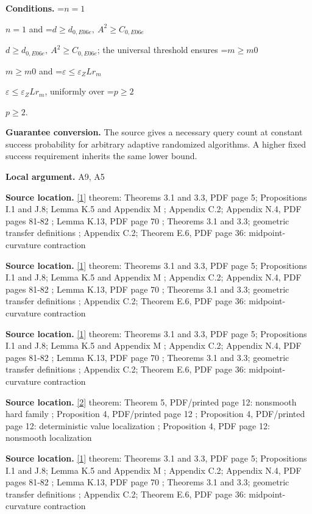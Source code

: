 \documentclass[10pt,a4paper]{article}
\newcommand{\AtlasMath}[1]{\par\begingroup\centering\setbox0=\hbox{$\displaystyle #1$}\ifdim\wd0>1.4\linewidth\typeout{ATLAS WIDE FORMULA: \the\wd0}\fi\ifdim\wd0>\linewidth\resizebox{\linewidth}{!}{\box0}\else\box0\fi\par\endgroup}
\newcommand{\AtlasInlineMath}[1]{\begingroup\setbox0=\hbox{$#1$}\ifdim\wd0>.4\linewidth\endgroup\AtlasMath{#1}\else\endgroup$#1$\fi}
\begin{document}
\textbf{Conditions.} \AtlasInlineMath{n=1} and \AtlasInlineMath{d\ge d_{0,E06e},\ A^2\ge C_{0,E06e}}; the universal threshold ensures \AtlasInlineMath{m\ge m0} and \AtlasInlineMath{\varepsilon \le \varepsilon _Z Lr_m}, uniformly over \AtlasInlineMath{p\ge 2}.

\textbf{Guarantee conversion.} The source gives a necessary query count at constant success probability for arbitrary adaptive randomized algorithms. A higher fixed success requirement inherits the same lower bound.

\textbf{Local argument.} A9, A5

\textbf{Source location.} \href{https://arxiv.org/html/2610.00345v1}{[1]} theorem: Theorems 3.1 and 3.3, PDF page 5; Propositions I.1 and J.8; Lemma K.5 and Appendix M ; Appendix C.2; Appendix N.4, PDF pages 81-82 ; Lemma K.13, PDF page 70 ; Theorems 3.1 and 3.3; geometric transfer definitions ; Appendix C.2; Theorem E.6, PDF page 36: midpoint-curvature contraction

\textbf{Source location.} \href{https://arxiv.org/html/2610.00345v1}{[1]} theorem: Theorems 3.1 and 3.3, PDF page 5; Propositions I.1 and J.8; Lemma K.5 and Appendix M ; Appendix C.2; Appendix N.4, PDF pages 81-82 ; Lemma K.13, PDF page 70 ; Theorems 3.1 and 3.3; geometric transfer definitions ; Appendix C.2; Theorem E.6, PDF page 36: midpoint-curvature contraction

\textbf{Source location.} \href{https://arxiv.org/html/2610.00345v1}{[1]} theorem: Theorems 3.1 and 3.3, PDF page 5; Propositions I.1 and J.8; Lemma K.5 and Appendix M ; Appendix C.2; Appendix N.4, PDF pages 81-82 ; Lemma K.13, PDF page 70 ; Theorems 3.1 and 3.3; geometric transfer definitions ; Appendix C.2; Theorem E.6, PDF page 36: midpoint-curvature contraction

\textbf{Source location.} \href{https://arxiv.org/html/2607.16558v2}{[2]} theorem: Theorem 5, PDF/printed page 12: nonsmooth hard family ; Proposition 4, PDF/printed page 12 ; Proposition 4, PDF/printed page 12: deterministic value localization ; Proposition 4, PDF page 12: nonsmooth localization

\textbf{Source location.} \href{https://arxiv.org/html/2610.00345v1}{[1]} theorem: Theorems 3.1 and 3.3, PDF page 5; Propositions I.1 and J.8; Lemma K.5 and Appendix M ; Appendix C.2; Appendix N.4, PDF pages 81-82 ; Lemma K.13, PDF page 70 ; Theorems 3.1 and 3.3; geometric transfer definitions ; Appendix C.2; Theorem E.6, PDF page 36: midpoint-curvature contraction
\end{document}
